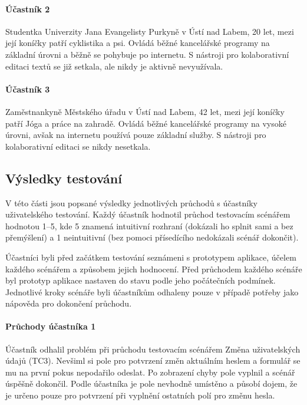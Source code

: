 \paragraph{Účastník 2}
Studentka Univerzity Jana Evangelisty Purkyně v Ústí nad Labem, 20 let, mezi její koníčky patří cyklistika a psi.
Ovládá běžné kancelářské programy na základní úrovni a běžně se pohybuje po internetu.
S nástroji pro kolaborativní editaci textů se již setkala, ale nikdy je aktivně nevyužívala.

\paragraph{Účastník 3}
Zaměstnankyně Městského úřadu v Ústí nad Labem, 42 let, mezi její koníčky patří Jóga a práce na zahradě.
Ovládá běžné kancelářské programy na vysoké úrovni, avšak na internetu používá pouze základní služby.
S nástroji pro kolaborativní editaci se nikdy nesetkala.

\subsection{Výsledky testování}\label{subsec:výsledkyTestování}

V této části jsou popsané výsledky jednotlivých průchodů s účastníky uživatelského testování.
Každý účastník hodnotil průchod testovacím scénářem hodnotou 1--5, kde 5 znamená intuitivní rozhraní (dokázali ho splnit sami a bez přemýšlení) a 1 neintuitivní (bez pomoci přísedícího nedokázali scénář dokončit).

Účastníci byli před začátkem testování seznámeni s prototypem aplikace, účelem každého scénářem a způsobem jejich hodnocení.
Před průchodem každého scénáře byl prototyp aplikace nastaven do stavu podle jeho počátečních podmínek.
Jednotlivé kroky scénáře byli účastníkům odhaleny pouze v případě potřeby jako nápověda pro dokončení průchodu.

\paragraph{Průchody účastníka 1}

Účastník odhalil problém při průchodu testovacím scénářem Změna uživatelských údajů (TC3).
Nevšiml si pole pro potvrzení změn aktuálním heslem a formulář se mu na první pokus nepodařilo odeslat.
Po zobrazení chyby pole vyplnil a scénář úspěšně dokončil.
Podle účastníka je pole nevhodně umístěno a působí dojem, že je určeno pouze pro potvrzení při vyplnění ostatních polí pro změnu hesla.


